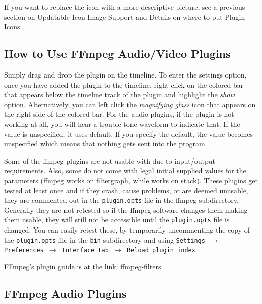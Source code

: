 If you want to replace the icon with a more descriptive picture, see a previous section on Updatable Icon Image Support and Details on where to put Plugin Icons.

\subsection{How to Use FFmpeg Audio/Video Plugins}%
\label{sub:use_ffmpeg_audio_video_plugins}

Simply drag and drop the plugin on the timeline. To enter the settings option, once you have added the plugin to the timeline, right click on the colored bar that appears below the timeline track of the plugin and highlight the \textit{show} option. Alternatively, you can left click the \textit{magnifying glass} icon that appears on the right side of the colored bar. For the audio plugins, if the plugin is not working at all, you will hear a trouble tone waveform to indicate that. If the value is unspecified, it uses default. If you specify the default, the value becomes unspecified which means that nothing gets sent into the program.

Some of the ffmpeg plugins are not usable with \CGGI{} due to input/output requirements. Also, some do not come with legal initial supplied values for the parameters (ffmpeg works on filtergraph, while \CGG{} works on stack). These plugins get tested at least once and if they crash, cause problems, or are deemed unusable, they are commented out in the \texttt{plugin.opts} file in the \CGG{} ffmpeg subdirectory. Generally they are not retested so if the ffmpeg software changes them making them usable, they will still not be accessible until the \texttt{plugin.opts} file is changed. You can easily retest these, by temporarily uncommenting the copy of the \texttt{plugin.opts} file in the \texttt{bin} subdirectory and using \texttt{Settings $\rightarrow$ Preferences $\rightarrow$ Interface tab $\rightarrow$ Reload plugin index}

FFmpeg’s plugin guide is at the link:
\href{https://ffmpeg.org/ffmpeg-filters.html}{ffmpeg-filters}.

\subsection{FFmpeg Audio Plugins}%
\label{sub:ffmpeg_audio_plugins}

